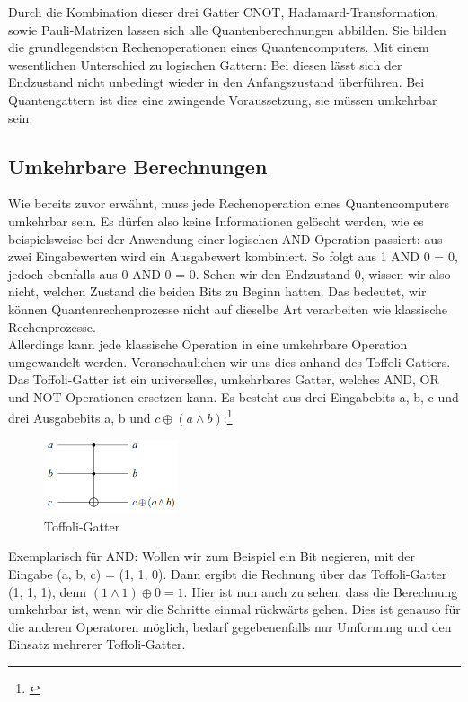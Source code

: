 Durch die Kombination dieser drei Gatter CNOT, Hadamard-Transformation, sowie Pauli-Matrizen lassen sich alle Quantenberechnungen abbilden.
Sie bilden die grundlegendsten Rechenoperationen eines Quantencomputers.
Mit einem wesentlichen Unterschied zu logischen Gattern: Bei diesen lässt sich der Endzustand nicht unbedingt wieder in den Anfangszustand überführen.
Bei Quantengattern ist dies eine zwingende Voraussetzung, sie müssen umkehrbar sein.\\


\subsection{Umkehrbare Berechnungen}
\label{subsec:umkehrbare-berechnungen}

Wie bereits zuvor erwähnt, muss jede Rechenoperation eines Quantencomputers umkehrbar sein.
Es dürfen also keine Informationen gelöscht werden, wie es beispielsweise bei der Anwendung einer logischen AND-Operation passiert: aus zwei Eingabewerten wird ein Ausgabewert kombiniert.
So folgt aus 1 AND 0 = 0, jedoch ebenfalls aus 0 AND 0 = 0.
Sehen wir den Endzustand 0, wissen wir also nicht, welchen Zustand die beiden Bits zu Beginn hatten.
Das bedeutet, wir können Quantenrechenprozesse nicht auf dieselbe Art verarbeiten wie klassische Rechenprozesse.\\

Allerdings kann jede klassische Operation in eine umkehrbare Operation umgewandelt werden.
Veranschaulichen wir uns dies anhand des Toffoli-Gatters.\\

Das Toffoli-Gatter ist ein universelles, umkehrbares Gatter, welches AND, OR und NOT Operationen ersetzen kann.
Es besteht aus drei Eingabebits a, b, c und drei Ausgabebits a, b und $c\oplus(a\land b)$:\footnote{\cite[S. 87]{homeister_quantum_2022}}\\
\begin{figure}[H]
    \centering
    \includegraphics[width=0.35\textwidth]{img/Umkehrbare_Berechnungen Toffoli}
    \caption{Toffoli-Gatter}
    \label{fig:toffoli-gatter}
\end{figure}

Exemplarisch für AND: Wollen wir zum Beispiel ein Bit negieren, mit der Eingabe (a, b, c) = (1, 1, 0).
Dann ergibt die Rechnung über das Toffoli-Gatter (1, 1, 1), denn $(1\land 1) \oplus 0 = 1$.
Hier ist nun auch zu sehen, dass die Berechnung umkehrbar ist, wenn wir die Schritte einmal rückwärts gehen.
Dies ist genauso für die anderen Operatoren möglich, bedarf gegebenenfalls nur Umformung und den Einsatz mehrerer Toffoli-Gatter.\\

